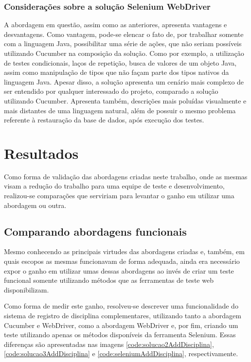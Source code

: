 \documentclass[tg]{mdtufsm}
\begin{document}
\subsection{Considerações sobre a solução Selenium WebDriver}
A abordagem em questão, assim como as anteriores, apresenta vantagens e desvantagens. Como vantagem, pode-se elencar o fato de, por trabalhar somente com a linguagem Java, possibilitar uma série de ações, que não seriam possíveis utilizando Cucumber na composição da solução. Como por exemplo, a utilização de testes condicionais, laços de repetição, busca de valores de um objeto Java, assim como manipulação de tipos que não façam parte dos tipos nativos da linguagem Java. Apesar disso, a solução apresenta um cenário mais complexo de ser entendido por qualquer interessado do projeto, comparado a solução utilizando Cucumber. Apresenta também, descrições mais poluídas visualmente e mais distantes de uma linguagem natural, além de possuir o mesmo problema referente à restauração da base de dados, após execução dos testes.

\chapter{Resultados}
Como forma de validação das abordagens criadas neste trabalho, onde as mesmas visam a redução do trabalho para uma equipe de teste e desenvolvimento, realizou-se comparações que serviriam para levantar o ganho em utilizar uma abordagem ou outra. 

\section{Comparando abordagens funcionais}
Mesmo conhecendo as principais virtudes das abordagens criadas e, também, em quais escopos as mesmas funcionavam de forma adequada, ainda era necessário expor o ganho em utilizar umas dessas abordagens ao invés de criar um teste funcional somente utilizando métodos que as ferramentas de teste web disponibilizam.

Como forma de medir este ganho, resolveu-se descrever uma funcionalidade do sistema de registro de disciplina complementares, utilizando tanto a abordagem Cucumber e WebDriver, como a abordagem WebDriver e, por fim, criando um teste utilizando apenas os métodos disponíveis da ferramenta Selenium. Essas diferenças são apresentadas nas imagens \ref{code:solucao2AddDisciplina}, \ref{code:solucao3AddDisciplina} e \ref{code:seleniumAddDisciplina}, respectivamente.
\end{document}
